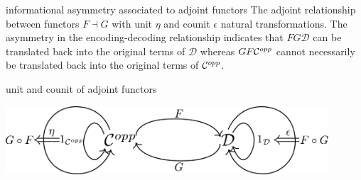 \begin{frame}
\begin{block}{informational asymmetry associated to adjoint functors}
The adjoint relationship between functors $F \dashv G$ with unit $\eta$ and counit $\epsilon$ natural transformations. The asymmetry in the encoding-decoding relationship indicates that $FG \mathcal{D}$ can be translated back into the original terms of $\mathcal{D}$ whereas $GF {\mathcal C}^{opp}$ cannot necessarily be translated back into the original terms of ${\mathcal C}^{opp}$.
\end{block}
\begin{block}{unit and counit of adjoint functors}
\begin{center}
\includegraphics[width=0.9\textwidth]{fig/adjunction.pdf}
\end{center}
\end{block}
\end{frame}